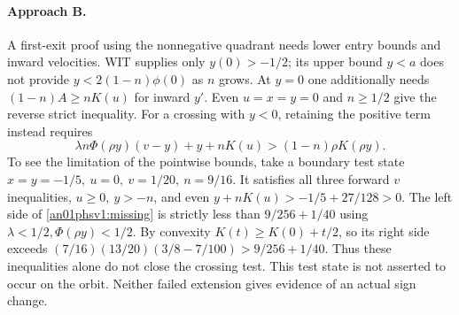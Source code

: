 \documentclass[11pt]{article}
\begin{document}
\paragraph{Approach B.} A first-exit proof using the nonnegative quadrant
needs lower entry bounds and inward velocities. WIT supplies only
\(y(0)>-1/2\); its upper bound \(y<a\) does not provide
\(y<2(1-n)\phi(0)\) as \(n\) grows. At \(y=0\) one additionally needs
\((1-n)A\ge nK(u)\) for inward \(y'\). Even \(u=x=y=0\) and
\(n\ge1/2\) give the reverse strict inequality.
For a crossing with \(y<0\), retaining the positive term instead
requires
\begin{equation}\label{an01phsv1:missing}
 \lambda n\Phi(\rho y)(v-y)+y+nK(u)>(1-n)\rho K(\rho y).
\end{equation}
To see the limitation of the pointwise bounds, take a boundary test
state \(x=y=-1/5,\ u=0,\ v=1/20,\ n=9/16\). It satisfies all three
forward \(v\) inequalities, \(u\ge0,\ y>-n\), and even
\(y+nK(u)>-1/5+27/128>0\).
The left side of \eqref{an01phsv1:missing} is strictly less than
\(9/256+1/40\) using \(\lambda<1/2,\Phi(\rho y)<1/2\).
By convexity \(K(t)\ge K(0)+t/2\), so its right side exceeds
\((7/16)(13/20)(3/8-7/100)>9/256+1/40\).
Thus these inequalities alone do not close the crossing test.
This test state is not asserted to occur on the orbit. Neither failed
extension gives evidence of an actual sign change.
\end{document}
